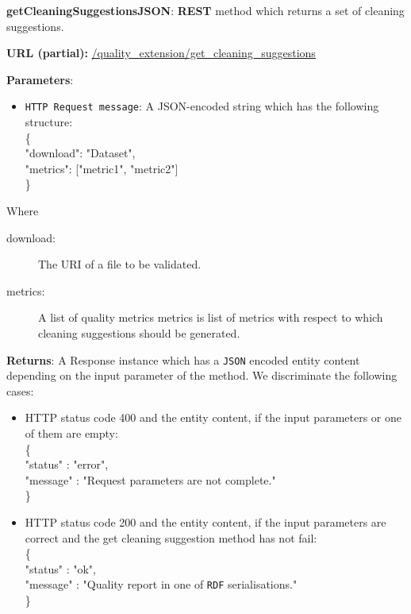 \begin{description}

\item{\textbf{getCleaningSuggestionsJSON}:} \textbf{REST} method which returns a set of cleaning suggestions.

\textbf{URL (partial):} \url{/quality_extension/get_cleaning_suggestions} 

\textbf{Parameters}: 
\begin{itemize}
\item \texttt{HTTP Request message}: A JSON-encoded string which has the following structure: \\
\hspace*{0.2 cm}\{\\
\hspace*{0.5 cm}"download": "Dataset", \\
\hspace*{0.5 cm}"metrics": ["metric1", "metric2"]  \\
\hspace*{0.2 cm}\} \\
\end{itemize}
Where
\begin{description}
\item[download:] The URI of a file to be validated. 
\item[metrics:] A list of quality metrics metrics is list of metrics with respect to which cleaning suggestions should be generated. 
\end{description}


\textbf{Returns}: A Response instance which has a \texttt{JSON} encoded entity content depending on the input parameter of the method. We discriminate the following cases: 
\begin{itemize}
\item  HTTP status code 400 and the entity content, if the input parameters or one of them are empty:\\ \hspace*{0.2 cm}\{\\
\hspace*{0.5 cm} "status" : "error",\\
\hspace*{0.5 cm} "message" : "Request parameters are not complete."\\ \hspace*{0.2 cm} \}

\item  HTTP status code 200 and the entity content, if the input parameters are correct and the get cleaning suggestion method has not fail:\\ \hspace*{0.2 cm} \{\\
 \hspace*{0.5 cm}"status" : "ok",\\ 
 \hspace*{0.5 cm}  "message" : "Quality report in one of \texttt{RDF} serialisations." \\ \hspace*{0.2 cm} \}


\end{itemize}
\end{description}
